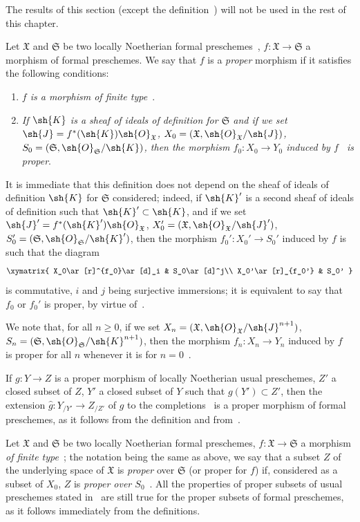 The results of this section (except the definition~) will not be used in the rest of this chapter.

\begin{env}[3.4.1]
\label{III.3.4.1}
Let $\mathfrak{X}$ and $\mathfrak{S}$ be two locally Noetherian formal preschemes~, $f:\mathfrak{X}\to\mathfrak{S}$ a morphism of formal preschemes.
We say that $f$ is a \emph{proper} morphism if it satisfies the following conditions:
\begin{enumerate}
  \item[1st.] \emph{$f$ is a morphism of finite type~}.
  \item[2nd.] \emph{If $\sh{K}$ is a sheaf of ideals of definition for $\mathfrak{S}$ and if we set $\sh{J}=f^*(\sh{K})\sh{O}_\mathfrak{X}$, $X_0=(\mathfrak{X},\sh{O}_\mathfrak{X}/\sh{J})$, $S_0=(\mathfrak{S},\sh{O}_\mathfrak{S}/\sh{K})$, then the morphism $f_0:X_0\to Y_0$ induced by $f$~ is proper}.
\end{enumerate}
It is immediate that this definition does not depend on the sheaf of ideals of definition $\sh{K}$ for $\mathfrak{S}$ considered; indeed, if $\sh{K}'$ is a second sheaf of ideals of definition such that $\sh{K}'\subset\sh{K}$, and if we set $\sh{J}'=f^*(\sh{K}')\sh{O}_\mathfrak{X}$, $X_0'=(\mathfrak{X},\sh{O}_\mathfrak{X}/\sh{J}')$, $S_0'=(\mathfrak{S},\sh{O}_\mathfrak{S}/\sh{K}')$, then the morphism $f_0':X_0'\to S_0'$ induced by $f$ is such that the diagram
\[
  \xymatrix{
    X_0\ar[r]^{f_0}\ar[d]_i &
    S_0\ar[d]^j\\
    X_0'\ar[r]_{f_0'} &
    S_0'
  }
\]
is commutative, $i$ and $j$ being surjective immersions; it is equivalent to say that $f_0$ or $f_0'$ is proper, by virtue of~.

We note that, for all $n\geq 0$, if we set $X_n=(\mathfrak{X},\sh{O}_\mathfrak{X}/\sh{J}^{n+1})$, $S_n=(\mathfrak{S},\sh{O}_\mathfrak{S}/\sh{K}^{n+1})$, then the morphism $f_n:X_n\to Y_n$ induced by $f$~ is proper for all $n$ whenever it is for $n=0$~.

If $g:Y\to Z$ is a proper morphism of locally Noetherian usual preschemes, $Z'$ a closed subset of $Z$, $Y'$ a closed subset of $Y$ such that $g(Y')\subset Z'$, then the extension $\widehat{g}:Y_{/Y'}\to Z_{/Z'}$ of $g$ to the completions~ is a proper morphism of formal preschemes, as it follows from the definition and from~.

Let $\mathfrak{X}$ and $\mathfrak{S}$ be two locally Noetherian formal preschemes, $f:\mathfrak{X}\to\mathfrak{S}$ a morphism \emph{of finite type}~; the notation being the same as above, we say that a subset $Z$ of the underlying space of $\mathfrak{X}$ is \emph{proper} over $\mathfrak{S}$ (or proper for $f$) if, considered as a subset of $X_0$, $Z$ is \emph{proper over $S_0$}~.
All the properties of proper subsets of usual preschemes stated in~ are still true for the proper subsets of formal preschemes, as it follows immediately from the definitions.
\end{env}

